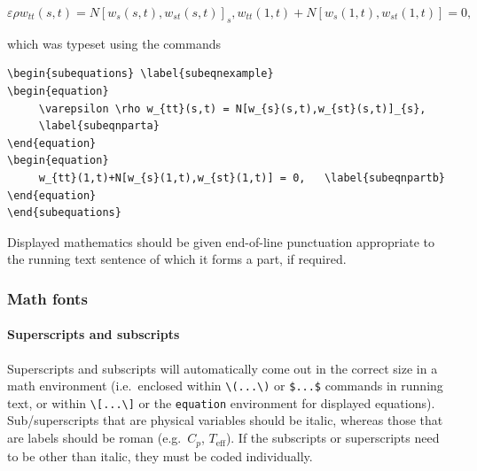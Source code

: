 \documentclass[]{interact}
\theoremstyle{plain}%
\theoremstyle{definition}
\theoremstyle{remark}
\begin{document}
\begin{subequations} \label{subeqnexample}
\begin{equation}
     \varepsilon \rho w_{tt}(s,t) = N[w_{s}(s,t),w_{st}(s,t)]_{s},
     \label{subeqnparta}
\end{equation}
\begin{equation}
     w_{tt}(1,t)+N[w_{s}(1,t),w_{st}(1,t)] = 0,
     \label{subeqnpartb}
\end{equation}
\end{subequations}

which was typeset using the commands

\begin{verbatim}
\begin{subequations} \label{subeqnexample}
\begin{equation}
     \varepsilon \rho w_{tt}(s,t) = N[w_{s}(s,t),w_{st}(s,t)]_{s},
     \label{subeqnparta}
\end{equation}
\begin{equation}
     w_{tt}(1,t)+N[w_{s}(1,t),w_{st}(1,t)] = 0,   \label{subeqnpartb}
\end{equation}
\end{subequations}
\end{verbatim}

Displayed mathematics should be given end-of-line punctuation
appropriate to the running text sentence of which it forms a part, if
required.

\hypertarget{math-fonts}{%
\subsubsection{Math fonts}\label{math-fonts}}

\hypertarget{superscripts-and-subscripts}{%
\paragraph{Superscripts and
subscripts}\label{superscripts-and-subscripts}}

Superscripts and subscripts will automatically come out in the correct
size in a math environment (i.e.~enclosed within
\texttt{\textbackslash{}(...\textbackslash{})} or \texttt{\$...\$}
commands in running text, or within
\texttt{\textbackslash{}{[}...\textbackslash{}{]}} or the
\texttt{equation} environment for displayed equations). Sub/superscripts
that are physical variables should be italic, whereas those that are
labels should be roman (e.g.~\(C_p\), \(T_\mathrm{eff}\)). If the
subscripts or superscripts need to be other than italic, they must be
coded individually.
\end{document}

